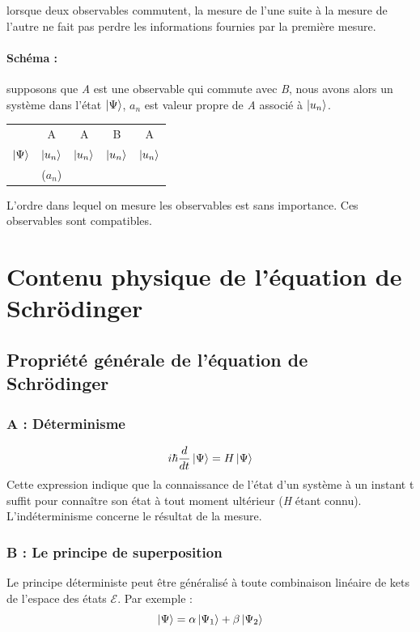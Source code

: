 \documentclass[12pt,a4paper,titlepage]{book}
\begin{document}
lorsque deux observables commutent, la mesure de l'une suite à la mesure de l'autre ne fait pas perdre les informations fournies par la première mesure.

\paragraph*{Schéma :}

supposons que \textit{A} est une observable qui commute avec \textit{B}, nous avons alors un système dans l'état $\ket\Psi$, $a_n$ est valeur propre de \textit{A} associé à $\ket{u_n}$.

\begin{table}[h!]
\begin{center}
\begin{tabular}{c|c|c|c|c}
& A & A & B & A\\
$\ket\Psi$ & $\ket{u_n}$ & $\ket{u_n}$ & $\ket{u_n}$ & $\ket{u_n}$\\
& ($a_n$) & & &
\end{tabular}
\end{center}
\end{table}

L'ordre dans lequel on mesure les observables est sans importance. Ces observables sont compatibles.

\section{Contenu physique de l'équation de Schrödinger}
\subsection{Propriété générale de l'équation de Schrödinger}
\subsubsection{A : Déterminisme}

\begin{equation*}
i \hbar \frac{d}{dt} \ket\Psi = H \ket\Psi
\end{equation*}
Cette expression indique que la connaissance de l'état d'un système à un instant t suffit pour connaître son état à tout moment ultérieur (\textit{H} étant connu).\\

L'indéterminisme concerne le résultat de la mesure.

\subsubsection{B : Le principe de superposition}
Le principe déterministe peut être généralisé à toute combinaison linéaire de kets de l'espace des états $\mathcal{E}$. Par exemple :
\begin{equation*}
\ket\Psi = \alpha \ket{\Psi_1} + \beta \ket{\Psi_2}
\end{equation*}
\end{document}
